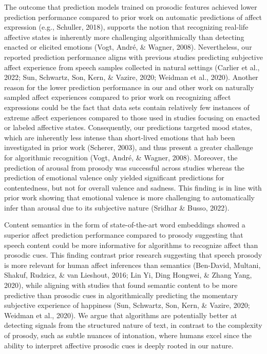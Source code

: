 \documentclass[
  english,
  man,floatsintext]{apa6}
\begin{document}
The outcome that prediction models trained on prosodic features achieved lower prediction performance compared to prior work on automatic predictions of affect expression (e.g., Schuller, 2018), supports the notion that recognizing real-life affective states is inherently more challenging algorithmically than detecting enacted or elicited emotions (Vogt, André, \& Wagner, 2008). Nevertheless, our reported prediction performance aligns with previous studies predicting subjective affect experience from speech samples collected in natural settings (Carlier et al., 2022; Sun, Schwartz, Son, Kern, \& Vazire, 2020; Weidman et al., 2020). Another reason for the lower prediction performance in our and other work on naturally sampled affect experiences compared to prior work on recognizing affect expressions could be the fact that data sets contain relatively few instances of extreme affect experiences compared to those used in studies focusing on enacted or labeled affective states. Consequently, our predictions targeted mood states, which are inherently less intense than short-lived emotions that hab been investigated in prior work (Scherer, 2003), and thus present a greater challenge for algorithmic recognition (Vogt, André, \& Wagner, 2008).
Moreover, the prediction of arousal from prosody was successful across studies whereas the prediction of emotional valence only yielded significant predictions for contentedness, but not for overall valence and sadness. This finding is in line with prior work showing that emotional valence is more challenging to automatically infer than arousal due to its subjective nature (Sridhar \& Busso, 2022).

Content semantics in the form of state-of-the-art word embeddings showed a superior affect prediction performance compared to prosody suggesting that speech content could be more informative for algorithms to recognize affect than prosodic cues. This finding contrast prior research suggesting that speech prosody is more relevant for human affect inferences than semantics (Ben-David, Multani, Shakuf, Rudzicz, \& van Lieshout, 2016; Lin Yi, Ding Hongwei, \& Zhang Yang, 2020), while aligning with studies that found semantic content to be more predictive than prosodic cues in algorithmically predicting the momentary subjective experience of happiness (Sun, Schwartz, Son, Kern, \& Vazire, 2020; Weidman et al., 2020). We argue that algorithms are potentially better at detecting signals from the structured nature of text, in contrast to the complexity of prosody, such as subtle nuances of intonation, where humans excel since the ability to interpret affective prosodic cues is deeply rooted in our nature.
\end{document}

